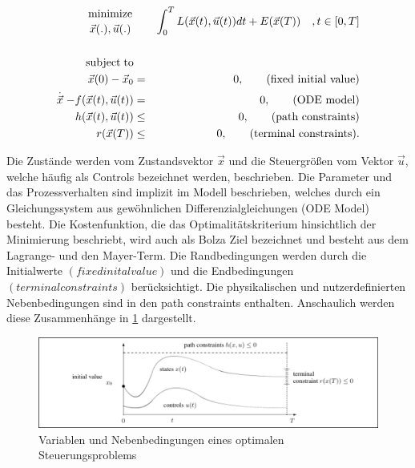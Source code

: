 \begin{eqnarray}
\label{eq:opt}
		{\text{minimize} \atop \vec{x}(.),\vec{u}(.)} & &\int_0^T L(\vec{x}(t),\vec{u}(t)) dt + E(\vec{x}(T)) \quad ,t \in [0,T] \\
\nonumber		&&\\
\nonumber		\text{subject}\; \text{to} & &\\
\nonumber		\vec{x}(0)-\vec{x}_{0} & = & 0,	\qquad \text{(fixed initial value)}\\
\nonumber		\stackrel{.}{\vec{x}}-f(\vec{x}(t),\vec{u}(t)) & = & 0,\qquad \text{(ODE model)}\\
\nonumber		h(\vec{x}(t),\vec{u}(t)) & \leq & 0, \qquad \text{(path constraints)}\\
\nonumber		r(\vec{x}(T)) & \leq & 0,\qquad \text{(terminal constraints).}
\end{eqnarray}

Die Zustände werden vom Zustandsvektor $\vec{x}$ und die Steuergrößen vom Vektor $\vec{u}$, welche häufig als Controls bezeichnet werden, beschrieben. Die Parameter und das Prozessverhalten sind implizit im Modell beschrieben, welches durch ein Gleichungssystem aus gewöhnlichen Differenzialgleichungen (ODE Model) besteht. Die Kostenfunktion, die das Optimalitätskriterium hinsichtlich der Minimierung beschriebt, wird auch als Bolza Ziel bezeichnet und besteht aus dem Lagrange- und den Mayer-Term. Die Randbedingungen werden durch die Initialwerte $(fixed inital value)$ und die Endbedingungen $(terminal constraints)$ berücksichtigt. Die physikalischen und nutzerdefinierten Nebenbedingungen sind in den path constraints enthalten. Anschaulich werden diese Zusammenhänge in \ref{fig:opt} dargestellt.

\begin{figure}
\centering
\includegraphics[width=\textwidth]{abbildungen/20160327_mpc}
\caption[Variablen und Nebenbedingungen eines optimalen Steuerungsproblems]{Variablen und Nebenbedingungen eines optimalen Steuerungsproblems \cite[S.61]{di14}}
\label{fig:opt}
\end{figure}

